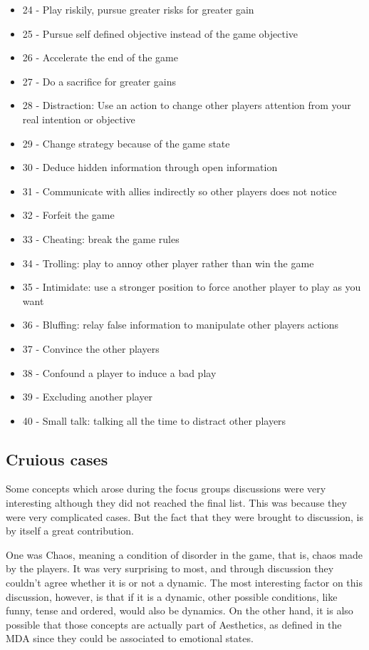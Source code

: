 \begin{multicols}{2}
\begin{itemize}
    \item 24 - Play riskily, pursue greater risks for greater gain
    \item 25 - Pursue self defined objective instead of the game objective
    \item 26 - Accelerate the end of the game
    \item 27 - Do a sacrifice for greater gains
    \item 28 - Distraction: Use an action to change other players attention from your real intention or objective
    \item 29 - Change strategy because of the game state
    \item 30 - Deduce hidden information through open information
    \item 31 - Communicate with allies indirectly so other players does not notice
    \item 32 - Forfeit the game
    \item 33 - Cheating: break the game rules
    \item 34 - Trolling: play to annoy other player rather than win the game
    \item 35 - Intimidate: use a stronger position to force another player to play as you want
    \item 36 - Bluffing: relay false information to manipulate other players actions
    \item 37 - Convince the other players
    \item 38 - Confound a player to induce a bad play
    \item 39 - Excluding another player
    \item 40 - Small talk: talking all the time to distract other players
 \end{itemize}
\end{multicols}

\subsection{Cruious cases}

Some concepts which arose during the focus groups discussions were very interesting although they did not reached the final list. This was because they were very complicated cases. But the fact that they were brought to discussion, is by itself a great contribution. 

One was Chaos, meaning a condition of disorder in the
game, that is, chaos made by the players. It was very
surprising to most, and through discussion they couldn’t
agree whether it is or not a dynamic. The most interesting
factor on this discussion, however, is that if it is a dynamic,
other possible conditions, like funny, tense and ordered,
would also be dynamics. On the other hand, it is also
possible that those concepts are actually part of Aesthetics,
as defined in the MDA\cite{Hunicke2004} since they could be associated to
emotional states.

